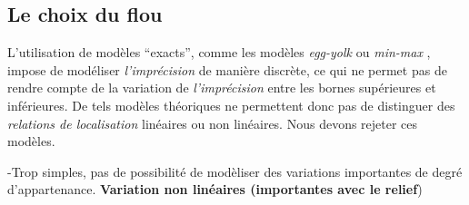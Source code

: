 \subsection{Le choix du flou}



L'utilisation de modèles \enquote{exacts}, comme les modèles
\emph{egg-yolk} \autocite{Cohn1996} ou \emph{min-max}
\autocite{Clementini1996}, impose de modéliser \emph{l'imprécision} de
manière discrète, ce qui ne permet pas de rendre compte de la
variation de \emph{l'imprécision} entre les bornes supérieures et
inférieures. De tels modèles théoriques ne permettent donc pas de
distinguer des \emph{relations de localisation} linéaires ou non
linéaires. Nous devons rejeter ces modèles.


-Trop simples, pas de possibilité de modèliser des variations
importantes de degré d'appartenance. \textbf{Variation non linéaires
  (importantes avec le relief})





